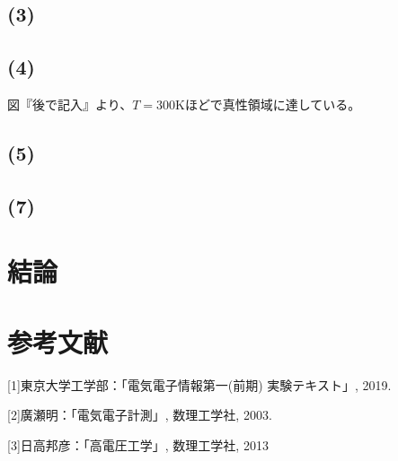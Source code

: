 \documentclass[dvipdfmx]{jsarticle}
\begin{document}
\subsection*{(3)}
\subsection*{(4)}
図『後で記入』より、$T = 300$Kほどで真性領域に達している。
\subsection*{(5)}
\subsection*{(7)}
\section{結論}



\section{参考文献}
[1]東京大学工学部：「電気電子情報第一(前期) 実験テキスト」, 2019.

[2]廣瀬明：「電気電子計測」, 数理工学社, 2003.

[3]日高邦彦：「高電圧工学」, 数理工学社, 2013
\end{document}
